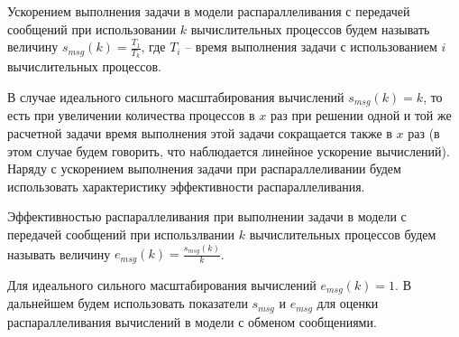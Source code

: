 \begin{definition}
Ускорением выполнения задачи в модели распараллеливания с передачей сообщений при использовании $k$ вычислительных процессов будем называть величину $s_{msg}(k) = \frac{T_1}{T_k}$, где $T_i$ -- время выполнения задачи с использованием $i$ вычислительных процессов. 
\end{definition}

В случае идеального сильного масштабирования вычислений $s_{msg}(k) = k$, то есть при увеличении количества процессов в $x$ раз при решении одной и той же расчетной задачи время выполнения этой задачи сокращается также в $x$ раз (в этом случае будем говорить, что наблюдается линейное ускорение вычислений).
Наряду с ускорением выполнения задачи при распараллеливании будем использовать характеристику эффективности распараллеливания.

\begin{definition}
Эффективностью распараллеливания при выполнении задачи в модели с передачей сообщений при использлвании $k$ вычислительных процессов будем называть величину $e_{msg}(k) = \frac{s_{msg}(k)}{k}$.
\end{definition}

Для идеального сильного масштабирования вычислений $e_{msg}(k) = 1$.
В дальнейшем будем использовать показатели $s_{msg}$ и $e_{msg}$ для оценки распараллеливания вычислений в модели с обменом сообщениями.

